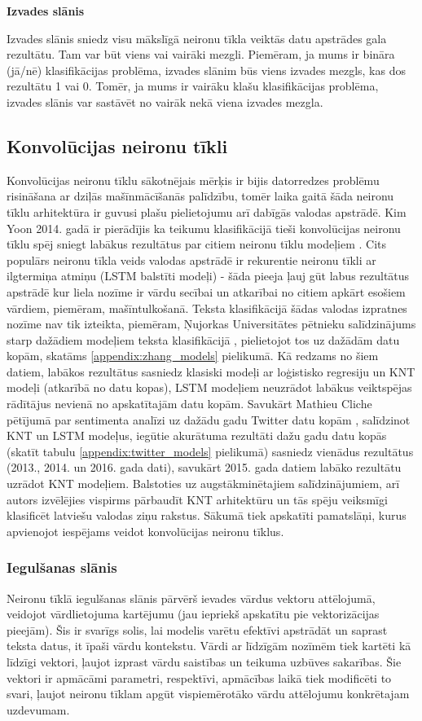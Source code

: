 \textbf{Izvades slānis}

Izvades slānis sniedz visu mākslīgā neironu tīkla veiktās datu apstrādes gala rezultātu. Tam var būt viens vai vairāki mezgli. Piemēram, ja mums ir bināra (jā/nē) klasifikācijas problēma, izvades slānim būs viens izvades mezgls, kas dos rezultātu 1 vai 0. Tomēr, ja mums ir vairāku klašu klasifikācijas problēma, izvades slānis var sastāvēt no vairāk nekā viena izvades mezgla.

\subsection{Konvolūcijas neironu tīkli}
Konvolūcijas neironu tīklu sākotnējais mērķis ir bijis datorredzes problēmu risināšana ar dziļās mašīnmācīšanās palīdzību, tomēr laika gaitā šāda neironu tīklu arhitektūra ir guvusi plašu pielietojumu arī dabīgās valodas apstrādē. Kim Yoon 2014. gadā ir pierādījis ka teikumu klasifikācijā tieši konvolūcijas neironu tīklu spēj sniegt labākus rezultātus par citiem neironu tīklu modeļiem \cite{kimYoonCNN}. Cits populārs neironu tīkla veids valodas apstrādē ir rekurentie neironu tīkli ar ilgtermiņa atmiņu (LSTM balstīti modeļi) - šāda pieeja ļauj gūt labus rezultātus apstrādē kur liela nozīme ir vārdu secībai un atkarībai no citiem apkārt esošiem vārdiem, piemēram, mašīntulkošanā. Teksta klasifikācijā šādas valodas izpratnes nozīme nav tik izteikta, piemēram, Ņujorkas Universitātes pētnieku salīdzinājums starp dažādiem modeļiem teksta klasifikācijā \cite{zhang2015characterlevel}, pielietojot tos uz dažādām datu kopām, skatāms \ref{appendix:zhang_models} pielikumā. Kā redzams no šiem datiem, labākos rezultātus sasniedz klasiski modeļi ar loģistisko regresiju un KNT modeļi (atkarībā no datu kopas), LSTM modeļiem neuzrādot labākus veiktspējas rādītājus nevienā no apskatītajām datu kopām. Savukārt Mathieu Cliche pētījumā par sentimenta analīzi uz dažādu gadu Twitter datu kopām \cite{cliche-2017-bb}, salīdzinot KNT un LSTM modeļus, iegūtie akurātuma rezultāti dažu gadu datu kopās (skatīt tabulu \ref{appendix:twitter_models} pielikumā) sasniedz vienādus rezultātus (2013., 2014. un  2016. gada dati), savukārt 2015. gada datiem labāko rezultātu uzrādot KNT modeļiem. Balstoties uz augstākminētajiem salīdzinājumiem, arī autors izvēlējies vispirms pārbaudīt KNT arhitektūru un tās spēju veiksmīgi klasificēt latviešu valodas ziņu rakstus. Sākumā tiek apskatīti pamatslāņi, kurus apvienojot iespējams veidot konvolūcijas neironu tīklus.

\subsubsection{Iegulšanas slānis}
Neironu tīklā iegulšanas slānis pārvērš ievades vārdus vektoru attēlojumā, veidojot vārdlietojuma kartējumu (jau iepriekš apskatītu pie vektorizācijas pieejām). Šis ir svarīgs solis, lai modelis varētu efektīvi apstrādāt un saprast teksta datus, it īpaši vārdu kontekstu. Vārdi ar līdzīgām nozīmēm tiek kartēti kā līdzīgi vektori, ļaujot izprast vārdu saistības un teikuma uzbūves sakarības. Šie vektori ir apmācāmi parametri, respektīvi, apmācības laikā tiek modificēti to svari, ļaujot neironu tīklam apgūt vispiemērotāko vārdu attēlojumu konkrētajam uzdevumam.

